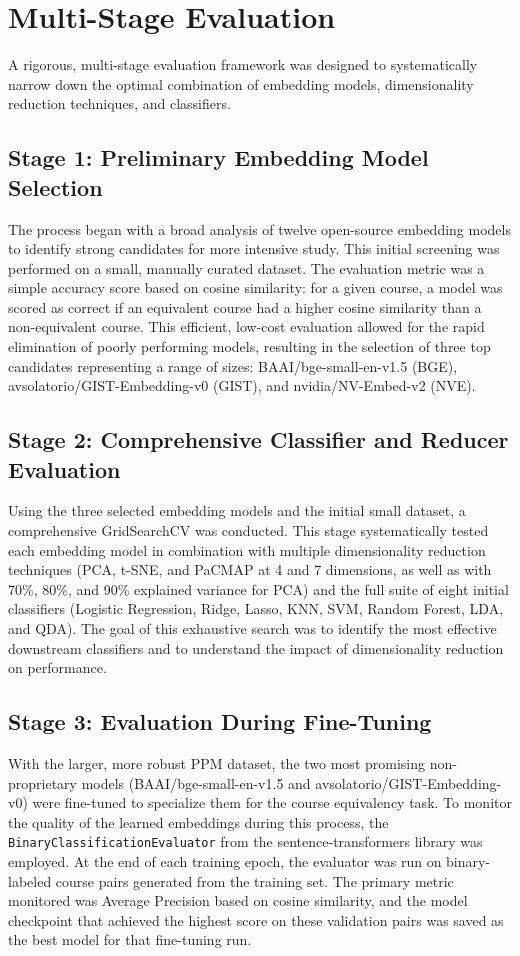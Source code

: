 \section{Multi-Stage Evaluation}
A rigorous, multi-stage evaluation framework was designed to systematically narrow down the optimal combination of embedding models, dimensionality reduction techniques, and classifiers.

\subsection{Stage 1: Preliminary Embedding Model Selection}
The process began with a broad analysis of twelve open-source embedding models to identify strong candidates for more intensive study. This initial screening was performed on a small, manually curated dataset. The evaluation metric was a simple accuracy score based on cosine similarity: for a given course, a model was scored as correct if an equivalent course had a higher cosine similarity than a non-equivalent course. This efficient, low-cost evaluation allowed for the rapid elimination of poorly performing models, resulting in the selection of three top candidates representing a range of sizes: BAAI/bge-small-en-v1.5 (BGE), avsolatorio/GIST-Embedding-v0 (GIST), and nvidia/NV-Embed-v2 (NVE).

\subsection{Stage 2: Comprehensive Classifier and Reducer Evaluation}
Using the three selected embedding models and the initial small dataset, a comprehensive GridSearchCV was conducted. This stage systematically tested each embedding model in combination with multiple dimensionality reduction techniques (PCA, t-SNE, and PaCMAP at 4 and 7 dimensions, as well as with 70\%, 80\%, and 90\% explained variance for PCA) and the full suite of eight initial classifiers (Logistic Regression, Ridge, Lasso, KNN, SVM, Random Forest, LDA, and QDA). The goal of this exhaustive search was to identify the most effective downstream classifiers and to understand the impact of dimensionality reduction on performance.

\subsection{Stage 3: Evaluation During Fine-Tuning}
With the larger, more robust PPM dataset, the two most promising non-proprietary models (BAAI/bge-small-en-v1.5 and avsolatorio/GIST-Embedding-v0) were fine-tuned to specialize them for the course equivalency task. To monitor the quality of the learned embeddings during this process, the \verb|BinaryClassificationEvaluator| from the sentence-transformers library was employed. At the end of each training epoch, the evaluator was run on binary-labeled course pairs generated from the training set. The primary metric monitored was Average Precision based on cosine similarity, and the model checkpoint that achieved the highest score on these validation pairs was saved as the best model for that fine-tuning run.

